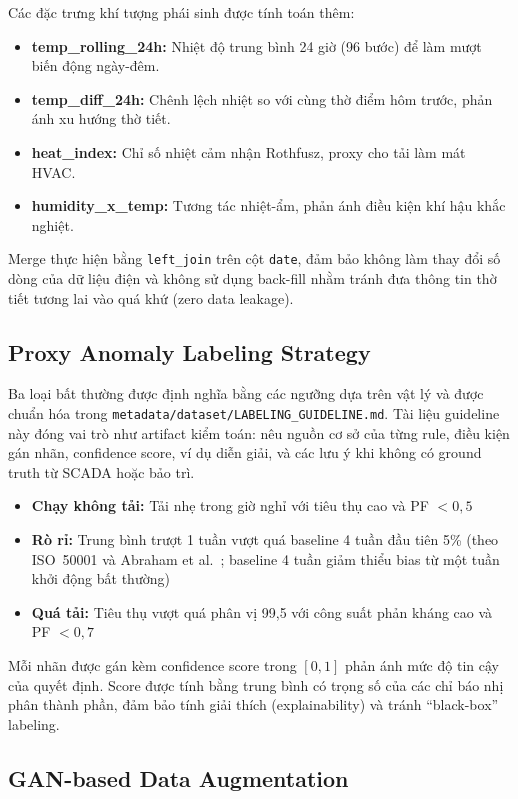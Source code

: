 Các đặc trưng khí tượng phái sinh được tính toán thêm:
\begin{itemize}
    \item \textbf{temp\_rolling\_24h:} Nhiệt độ trung bình 24 giờ (96 bước) để làm mượt biến động ngày-đêm.
    \item \textbf{temp\_diff\_24h:} Chênh lệch nhiệt so với cùng thờ điểm hôm trước, phản ánh xu hướng thờ tiết.
    \item \textbf{heat\_index:} Chỉ số nhiệt cảm nhận Rothfusz, proxy cho tải làm mát HVAC.
    \item \textbf{humidity\_x\_temp:} Tương tác nhiệt-ẩm, phản ánh điều kiện khí hậu khắc nghiệt.
\end{itemize}

Merge thực hiện bằng \texttt{left\_join} trên cột \texttt{date},
đảm bảo không làm thay đổi số dòng của dữ liệu điện và không sử dụng back-fill
nhằm tránh đưa thông tin thờ tiết tương lai vào quá khứ (zero data leakage).

\subsection{Proxy Anomaly Labeling Strategy}

Ba loại bất thường được định nghĩa bằng các ngưỡng dựa trên vật lý và được chuẩn hóa trong
\texttt{metadata/dataset/LABELING\_GUIDELINE.md}. Tài liệu guideline này đóng vai trò như artifact kiểm toán:
nêu nguồn cơ sở của từng rule, điều kiện gán nhãn, confidence score, ví dụ diễn giải,
và các lưu ý khi không có ground truth từ SCADA hoặc bảo trì.
\begin{itemize}
\item \textbf{Chạy không tải:} Tải nhẹ trong giờ nghỉ với tiêu thụ cao và PF $< 0{,}5$
\item \textbf{Rò rỉ:} Trung bình trượt 1 tuần vượt quá baseline 4 tuần đầu tiên 5\%
(theo ISO~50001 và Abraham et al.~\cite{abraham2021iso};
baseline 4 tuần giảm thiểu bias từ một tuần khởi động bất thường)
\item \textbf{Quá tải:} Tiêu thụ vượt quá phân vị 99{,}5 với công suất phản kháng cao và PF $< 0{,}7$
\end{itemize}

Mỗi nhãn được gán kèm confidence score trong $[0,1]$ phản ánh mức độ tin cậy của quyết định.
Score được tính bằng trung bình có trọng số của các chỉ báo nhị phân thành phần,
đảm bảo tính giải thích (explainability) và tránh ``black-box'' labeling.

\subsection{GAN-based Data Augmentation}

